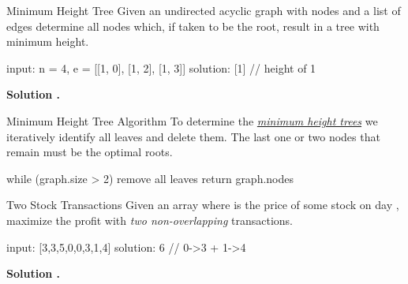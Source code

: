 \documentclass{cognito}
\begin{document}
\begin{note}{Minimum Height Tree}
	Given an undirected acyclic graph with  nodes and a list of edges 
	determine all nodes which, if taken to be the root, result in a tree with minimum height.

	\begin{largecode}
 input: n = 4, e = [[1, 0], [1, 2], [1, 3]]
 solution: [1]  // height of 1
	\end{largecode}
	\bf Solution \hyperref[note:Minimum Height Tree Algorithm]{\solutionref}.
\end{note}

\begin{note}{Minimum Height Tree Algorithm}
	To determine the \hyperref[note:Minimum Height Tree]{\it minimum height trees}
	we iteratively identify all leaves and delete them. The last one or two nodes that remain
	must be the optimal roots.

	\begin{largecode}
 while (graph.size > 2)
	remove all leaves
 return graph.nodes
	\end{largecode}
	\vspace{-5pt}
\end{note}



\begin{note}{Two Stock Transactions}
	\favorite
	Given an array where  is the price of some stock on day ,
	maximize the profit with {\it two non-overlapping} transactions.
	
	\begin{largecode}
 input: [3,3,5,0,0,3,1,4]
 solution: 6  // 0->3 + 1->4
	\end{largecode}
	\bf Solution \hyperref[note:Linear Two Stock Optimization]{\solutionref}.
\end{note}
\end{document}
